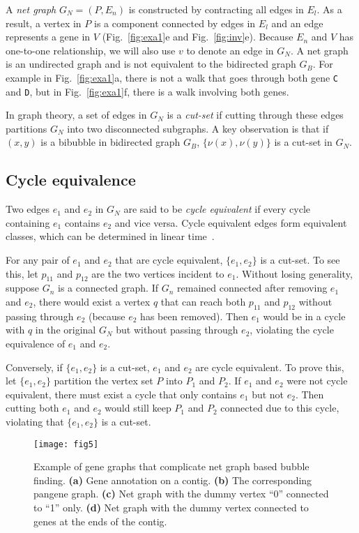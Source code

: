 \documentclass[webpdf,contemporary,large,namedate]{oup-authoring-template}%
\begin{document}
A \emph{net graph} $G_N=(P,E_n)$ is constructed by contracting all edges in $E_l$.
As a result, a vertex in $P$ is a component connected by edges in $E_l$
and an edge represents a gene in $V$ (Fig.~\ref{fig:exa1}e and Fig.~\ref{fig:inv}e).
Because $E_n$ and $V$ has one-to-one relationship, we will also use $v$ to denote an edge in $G_N$.
A net graph is an undirected graph and is not equivalent to the bidirected graph $G_B$.
For example in Fig.~\ref{fig:exa1}a, there is not a walk that goes through both gene {\tt C} and {\tt D},
but in Fig.~\ref{fig:exa1}f, there is a walk involving both genes.

In graph theory, a set of edges in $G_N$ is a \emph{cut-set} if cutting through these edges
partitions $G_N$ into two disconnected subgraphs.
A key observation is that if $(x,y)$ is a bibubble in bidirected graph $G_B$,
$\{\nu(x),\nu(y)\}$ is a cut-set in $G_N$.

\subsection{Cycle equivalence}

Two edges $e_1$ and $e_2$ in $G_N$ are said to be \emph{cycle equivalent}
if every cycle containing $e_1$ contains $e_2$ and vice versa.
Cycle equivalent edges form equivalent classes, which can be determined in linear time~\citep{DBLP:conf/pldi/JohnsonPP94}.

For any pair of $e_1$ and $e_2$ that are cycle equivalent, $\{e_1,e_2\}$ is a cut-set.
To see this, let $p_{11}$ and $p_{12}$ are the two vertices incident to $e_1$.
Without losing generality, suppose $G_n$ is a connected graph.
If $G_n$ remained connected after removing $e_1$ and $e_2$,
there would exist a vertex $q$ that can reach both $p_{11}$ and $p_{12}$ without passing through $e_2$ (because $e_2$ has been removed).
Then $e_1$ would be in a cycle with $q$ in the original $G_N$ but without passing through $e_2$,
violating the cycle equivalence of $e_1$ and $e_2$.

Conversely, if $\{e_1,e_2\}$ is a cut-set, $e_1$ and $e_2$ are cycle equivalent.
To prove this, let $\{e_1,e_2\}$ partition the vertex set $P$ into $P_1$ and $P_2$.
If $e_1$ and $e_2$ were not cycle equivalent, there must exist a cycle that only contains $e_1$ but not $e_2$.
Then cutting both $e_1$ and $e_2$ would still keep $P_1$ and $P_2$ connected due to this cycle,
violating that $\{e_1,e_2\}$ is a cut-set.

\begin{figure}[t!]
\centering
\texttt{[image: fig5]}
\caption{Example of gene graphs that complicate net graph based bubble finding.
{\bf (a)} Gene annotation on a contig.
{\bf (b)} The corresponding pangene graph.
{\bf (c)} Net graph with the dummy vertex ``0'' connected to ``1'' only.
{\bf (d)} Net graph with the dummy vertex connected to genes at the ends of the contig.
}\label{fig:complex}
\end{figure}
\end{document}
